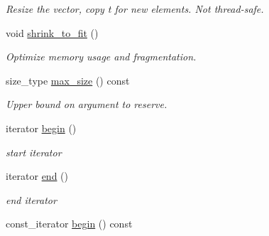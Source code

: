 \begin{DoxyCompactItemize}
\begin{DoxyCompactList}\small\item\em Resize the vector, copy t for new elements. Not thread-\/safe. \end{DoxyCompactList}\item 
\hypertarget{classtbb_1_1concurrent__vector_aba805b5225ad3399550f78ea15e51e93}{}void \hyperlink{classtbb_1_1concurrent__vector_aba805b5225ad3399550f78ea15e51e93}{shrink\+\_\+to\+\_\+fit} ()\label{classtbb_1_1concurrent__vector_aba805b5225ad3399550f78ea15e51e93}

\begin{DoxyCompactList}\small\item\em Optimize memory usage and fragmentation. \end{DoxyCompactList}\item 
\hypertarget{classtbb_1_1concurrent__vector_acca0f16367501f4c51981abfaeda7c0b}{}size\+\_\+type \hyperlink{classtbb_1_1concurrent__vector_acca0f16367501f4c51981abfaeda7c0b}{max\+\_\+size} () const \label{classtbb_1_1concurrent__vector_acca0f16367501f4c51981abfaeda7c0b}

\begin{DoxyCompactList}\small\item\em Upper bound on argument to reserve. \end{DoxyCompactList}\item 
\hypertarget{classtbb_1_1concurrent__vector_a2914571ae4553453e3046132bd1dc4ec}{}iterator \hyperlink{classtbb_1_1concurrent__vector_a2914571ae4553453e3046132bd1dc4ec}{begin} ()\label{classtbb_1_1concurrent__vector_a2914571ae4553453e3046132bd1dc4ec}

\begin{DoxyCompactList}\small\item\em start iterator \end{DoxyCompactList}\item 
\hypertarget{classtbb_1_1concurrent__vector_a2103c324fe1195d57778df2b4df2a427}{}iterator \hyperlink{classtbb_1_1concurrent__vector_a2103c324fe1195d57778df2b4df2a427}{end} ()\label{classtbb_1_1concurrent__vector_a2103c324fe1195d57778df2b4df2a427}

\begin{DoxyCompactList}\small\item\em end iterator \end{DoxyCompactList}\item 
\hypertarget{classtbb_1_1concurrent__vector_aa4339915512950e809abdc71164570f9}{}const\+\_\+iterator \hyperlink{classtbb_1_1concurrent__vector_aa4339915512950e809abdc71164570f9}{begin} () const \label{classtbb_1_1concurrent__vector_aa4339915512950e809abdc71164570f9}


\end{DoxyCompactItemize}
